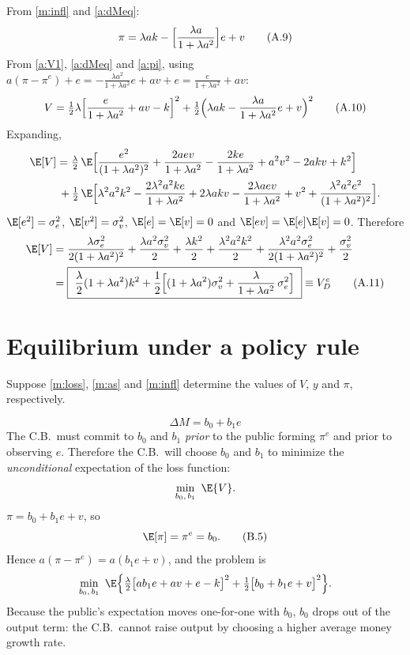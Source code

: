 \documentclass[11pt]{article}
\begin{document}
From \eqref{m:infl} and \eqref{a:dMeq}:
\begin{equation}
  \pi=\lambda ak-\Bigl[\frac{\lambda a}{1+\lambda a^2}\Bigr]e+v \tag{A.9}\label{a:pi}
\end{equation}
From \eqref{a:V1}, \eqref{a:dMeq} and \eqref{a:pi}, using
$a(\pi-\pi^e)+e=-\frac{\lambda a^2}{1+\lambda a^2}e+av+e=\frac{e}{1+\lambda a^2}+av$:
\begin{equation}
  V=\tfrac12\lambda\Bigl[\frac{e}{1+\lambda a^2}+av-k\Bigr]^2
   +\tfrac12\Bigl(\lambda ak-\frac{\lambda a}{1+\lambda a^2}e+v\Bigr)^2
  \tag{A.10}\label{a:V}
\end{equation}
Expanding,
\begin{align*}
  \E[V]=\tfrac{\lambda}{2}\,\E\Bigl[&\frac{e^2}{(1+\lambda a^2)^2}+\frac{2aev}{1+\lambda a^2}
     -\frac{2ke}{1+\lambda a^2}+a^2v^2-2akv+k^2\Bigr]\\
  {}+\tfrac12\,\E\Bigl[&\lambda^2a^2k^2-\frac{2\lambda^2a^2ke}{1+\lambda a^2}+2\lambda akv
     -\frac{2\lambda aev}{1+\lambda a^2}+v^2+\frac{\lambda^2a^2e^2}{(1+\lambda a^2)^2}\Bigr].
\end{align*}
 $\E[e^2]=\sigma_e^2$, $\E[v^2]=\sigma_v^2$, $\E[e]=\E[v]=0$ and
$\E[ev]=\E[e]\E[v]=0$. Therefore
\begin{align}
  \E[V]&=\frac{\lambda\sigma_e^2}{2(1+\lambda a^2)^2}+\frac{\lambda a^2\sigma_v^2}{2}
        +\frac{\lambda k^2}{2}+\frac{\lambda^2a^2k^2}{2}
        +\frac{\lambda^2a^2\sigma_e^2}{2(1+\lambda a^2)^2}+\frac{\sigma_v^2}{2}\notag\\
       &=\boxed{\ \frac{\lambda}{2}(1+\lambda a^2)k^2
        +\frac12\Bigl[(1+\lambda a^2)\sigma_v^2+\frac{\lambda}{1+\lambda a^2}\,\sigma_e^2\Bigr]
        \ }\equiv V_D^e \tag{A.11}\label{a:VD}
\end{align}


\section{Equilibrium under a policy rule}

Suppose \eqref{m:loss}, \eqref{m:as} and \eqref{m:infl} determine the values of $V$, $y$ and
$\pi$, respectively.

\begin{equation}
  \Delta M=b_0+b_1e \tag{B.4}\label{b:rule}
\end{equation}
The C.B.\ must commit to $b_0$ and $b_1$ \emph{prior} to the public forming $\pi^e$ and
prior to observing $e$. Therefore the C.B.\ will choose $b_0$ and $b_1$ to minimize the
\emph{unconditional} expectation of the loss function:
\[ \min_{b_0,\,b_1}\ \E\{V\}. \]
 $\pi=b_0+b_1e+v$, so
\begin{equation}
  \E[\pi]=\pi^e=b_0 . \tag{B.5}\label{b:pie}
\end{equation}
Hence $a(\pi-\pi^e)=a(b_1e+v)$, and the problem is
\[
  \min_{b_0,\,b_1}\ \E\Bigl\{\tfrac{\lambda}{2}\bigl[ab_1e+av+e-k\bigr]^2
     +\tfrac12\bigl[b_0+b_1e+v\bigr]^2\Bigr\}.
\]
Because the public's expectation moves one-for-one with $b_0$, $b_0$ drops out of the
output term: the C.B.\ cannot raise output by choosing a higher average money growth rate.
\end{document}
